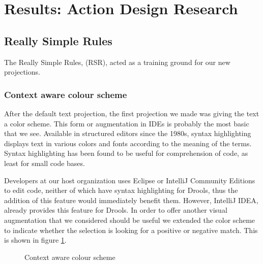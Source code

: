 \section{Results: Action Design Research}\label{section:Results_ADR}

\subsection{Really Simple Rules}

The Really Simple Rules, (RSR), acted as a training ground for our new projections.

\subsubsection{Context aware colour scheme}
After the default text projection, the first projection we made was giving the text a color scheme.
This form or augmentation in IDEs is probably the most basic that we see.
Available in structured editors since the 1980s\cite{cowlishaw1987lexx}, syntax highlighting displays text in various colors and fonts according to the meaning of the terms.
Syntax highlighting has been found to be useful for comprehension of code, as least for small code bases\cite{sarkar2015impact}.

Developers at our host organization uses Eclipse or IntelliJ Community Editions to edit code, neither of which have syntax highlighting for Drools, thus the addition of this feature would immediately benefit them.
However, IntelliJ IDEA, already provides this feature for Drools.
In order to offer another visual augmentation that we considered should be useful we extended the color scheme to indicate whether the selection is looking for a positive or negative match.
This is shown in figure \ref{fig:colorscheme}.

\begin{figure}[h]
    \centering
    \caption{Context aware colour scheme}
    \label{fig:colorscheme}
\end{figure}

